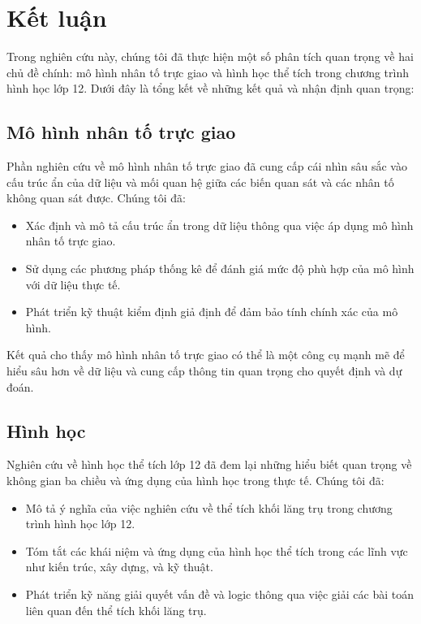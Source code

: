 \chapter*{Kết luận}

Trong nghiên cứu này, chúng tôi đã thực hiện một số phân tích quan trọng về hai chủ đề chính: mô hình nhân tố trực giao và hình học thể tích trong chương trình hình học lớp 12. Dưới đây là tổng kết về những kết quả và nhận định quan trọng:

\section*{Mô hình nhân tố trực giao}

Phần nghiên cứu về mô hình nhân tố trực giao đã cung cấp cái nhìn sâu sắc vào cấu trúc ẩn của dữ liệu và mối quan hệ giữa các biến quan sát và các nhân tố không quan sát được. Chúng tôi đã:

\begin{itemize}
    \item Xác định và mô tả cấu trúc ẩn trong dữ liệu thông qua việc áp dụng mô hình nhân tố trực giao.
    \item Sử dụng các phương pháp thống kê để đánh giá mức độ phù hợp của mô hình với dữ liệu thực tế.
    \item Phát triển kỹ thuật kiểm định giả định để đảm bảo tính chính xác của mô hình.
\end{itemize}

Kết quả cho thấy mô hình nhân tố trực giao có thể là một công cụ mạnh mẽ để hiểu sâu hơn về dữ liệu và cung cấp thông tin quan trọng cho quyết định và dự đoán.

\section*{Hình học}

Nghiên cứu về hình học thể tích lớp 12 đã đem lại những hiểu biết quan trọng về không gian ba chiều và ứng dụng của hình học trong thực tế. Chúng tôi đã:

\begin{itemize}
    \item Mô tả ý nghĩa của việc nghiên cứu về thể tích khối lăng trụ trong chương trình hình học lớp 12.
    \item Tóm tắt các khái niệm và ứng dụng của hình học thể tích trong các lĩnh vực như kiến trúc, xây dựng, và kỹ thuật.
    \item Phát triển kỹ năng giải quyết vấn đề và logic thông qua việc giải các bài toán liên quan đến thể tích khối lăng trụ.
\end{itemize}

